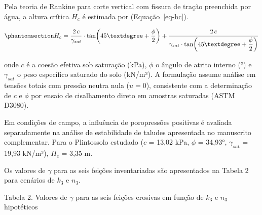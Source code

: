 \documentclass[
  brazilian,
  authoryear,
  preprint]{elsarticle}
\begin{document}
Pela teoria de Rankine para corte vertical com fissura de tração
preenchida por água, a altura crítica \(H_c\) é estimada por
(Equação~\ref{eq-hc}).

\begin{equation}\phantomsection\label{eq-hc}{
H_c = \dfrac{2\,c}{\gamma_{sat}} \cdot \tan\!\left(45° + \dfrac{\phi}{2}\right) + \dfrac{2\,c}{\gamma_{sat} \cdot \tan\!\left(45° + \dfrac{\phi}{2}\right)}
}\end{equation}

onde \(c\) é a coesão efetiva sob saturação (kPa), \(\phi\) o ângulo de
atrito interno (°) e \(\gamma_{sat}\) o peso específico saturado do solo
(kN/m³). A formulação assume análise em tensões totais com pressão
neutra nula (\(u = 0\)), consistente com a determinação de \(c\) e
\(\phi\) por ensaio de cisalhamento direto em amostras saturadas (ASTM
D3080).

Em condições de campo, a influência de poropressões positivas é avaliada
separadamente na análise de estabilidade de taludes apresentada no
manuscrito complementar. Para o Plintossolo estudado (\(c\) = 13,02 kPa,
\(\phi\) = 34,93°, \(\gamma_{sat}\) = 19,93 kN/m³), \(H_c\) = 3,35 m.

Os valores de \(\gamma\) para as seis feições inventariadas são
apresentados na Tabela 2 para cenários de \(k_3\) e \(n_3\).

Tabela 2. Valores de \(\gamma\) para as seis feições erosivas em função
de \(k_3\) e \(n_3\) hipotéticos
\end{document}
